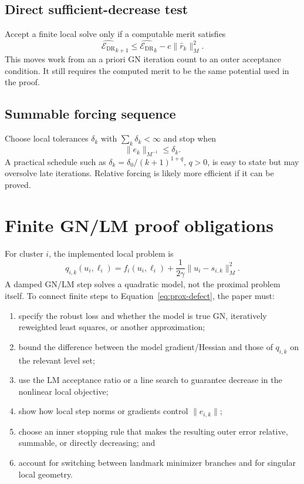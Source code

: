 \documentclass[11pt]{article}
\newcommand{\Edr}{\mathcal{E}_{\mathrm{DR}}}
\newcommand{\normM}[1]{\lVert #1\rVert_M}
\newcommand{\normMi}[1]{\lVert #1\rVert_{M^{-1}}}
\begin{document}
\subsection{Direct sufficient-decrease test}

Accept a finite local solve only if a computable merit satisfies
\begin{equation}
  \widehat{\Edr}_{k+1}
  \leq\widehat{\Edr}_k-c\normM{\widehat r_k}^2.
  \label{eq:direct-decrease}
\end{equation}
This moves work from an a priori GN iteration count to an outer acceptance
condition.  It still requires the computed merit to be the same potential
used in the proof.

\subsection{Summable forcing sequence}

Choose local tolerances $\delta_k$ with $\sum_k\delta_k<\infty$ and stop when
\begin{equation}
  \normMi{e_k}\leq\delta_k.
\end{equation}
A practical schedule such as $\delta_k=\delta_0/(k+1)^{1+q}$, $q>0$, is easy
to state but may oversolve late iterations.  Relative forcing is likely more
efficient if it can be proved.

\section{Finite GN/LM proof obligations}

For cluster $i$, the implemented local problem is
\begin{equation}
  q_{i,k}(u_i,\ell_i)=f_i(u_i,\ell_i)
  +\frac{1}{2\gamma}\normM{u_i-s_{i,k}}^2.
\end{equation}
A damped GN/LM step solves a quadratic model, not the proximal problem itself.
To connect finite steps to Equation~\eqref{eq:prox-defect}, the paper must:
\begin{enumerate}
  \item specify the robust loss and whether the model is true GN,
        iteratively reweighted least squares, or another approximation;
  \item bound the difference between the model gradient/Hessian and those of
        $q_{i,k}$ on the relevant level set;
  \item use the LM acceptance ratio or a line search to guarantee decrease in
        the nonlinear local objective;
  \item show how local step norms or gradients control $\lVert e_{i,k}\rVert$;
  \item choose an inner stopping rule that makes the resulting outer error
        relative, summable, or directly decreasing; and
  \item account for switching between landmark minimizer branches and for
        singular local geometry.
\end{enumerate}
\end{document}
